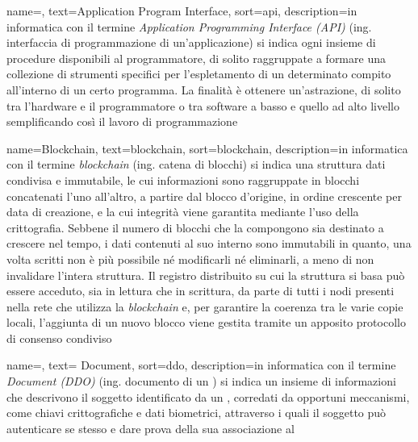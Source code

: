 
\renewcommand{\glossaryname}{Glossario}

{
    name=,
    text=Application Program Interface,
    sort=api,
    description={in informatica con il termine \emph{Application Programming Interface (API)} (ing. interfaccia di programmazione di un'applicazione) si indica ogni insieme di procedure disponibili al programmatore, di solito raggruppate a formare una collezione di strumenti specifici per l'espletamento di un determinato compito all'interno di un certo programma. La finalità è ottenere un'astrazione, di solito tra l'hardware e il programmatore o tra software a basso e quello ad alto livello semplificando così il lavoro di programmazione}
}

{
	name=Blockchain,
	text=blockchain,
	sort=blockchain,
	description={in informatica con il termine \emph{blockchain} (ing. catena di blocchi) si indica una struttura dati condivisa e immutabile, le cui informazioni sono raggruppate in blocchi concatenati l'uno all'altro, a partire dal blocco d'origine, in ordine crescente per data di creazione, e la cui integrità viene garantita mediante l'uso della crittografia. Sebbene il numero di blocchi che la compongono sia destinato a crescere nel tempo, i dati contenuti al suo interno sono immutabili in quanto, una volta scritti non è più possibile né modificarli né eliminarli, a meno di non invalidare l'intera struttura. Il registro distribuito su cui la struttura si basa può essere acceduto, sia in lettura che in scrittura, da parte di tutti i nodi presenti nella rete che utilizza la \emph{blockchain} e, per garantire la coerenza tra le varie copie locali, l'aggiunta di un nuovo blocco viene gestita tramite un apposito protocollo di consenso condiviso}
}

{
	name=,
	text= Document,
	sort=ddo,
	description={in informatica con il termine \emph{ Document (DDO)} (ing. documento di un ) si indica un insieme di informazioni che descrivono il soggetto identificato da un , corredati da opportuni meccanismi, come chiavi crittografiche e dati biometrici, attraverso i quali il soggetto può autenticare se stesso e dare prova della sua associazione al }
}

